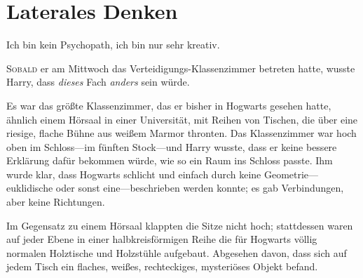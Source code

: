 \chapter{Laterales Denken}

\begin{chapterOpeningQuote}
Ich bin kein Psychopath, ich bin nur sehr kreativ.
\end{chapterOpeningQuote}

\lettrine{S}{obald} er am Mittwoch das Verteidigungs-Klassenzimmer betreten hatte, wusste Harry, dass \emph{dieses} Fach \emph{anders} sein würde.

Es war das größte Klassenzimmer, das er bisher in Hogwarts gesehen hatte, ähnlich einem Hörsaal in einer Universität, mit Reihen von Tischen, die über eine riesige, flache Bühne aus weißem Marmor thronten. Das Klassenzimmer war hoch oben im Schloss—im fünften Stock—und Harry wusste, dass er keine bessere Erklärung dafür bekommen würde, wie so ein Raum ins Schloss passte. Ihm wurde klar, dass Hogwarts schlicht und einfach durch keine Geometrie—euklidische oder sonst eine—beschrieben werden konnte; es gab Verbindungen, aber keine Richtungen.

Im Gegensatz zu einem Hörsaal klappten die Sitze nicht hoch; stattdessen waren auf jeder Ebene in einer halbkreisförmigen Reihe die für Hogwarts völlig normalen Holztische und Holzstühle aufgebaut. Abgesehen davon, dass sich auf jedem Tisch ein flaches, weißes, rechteckiges, mysteriöses Objekt befand.

